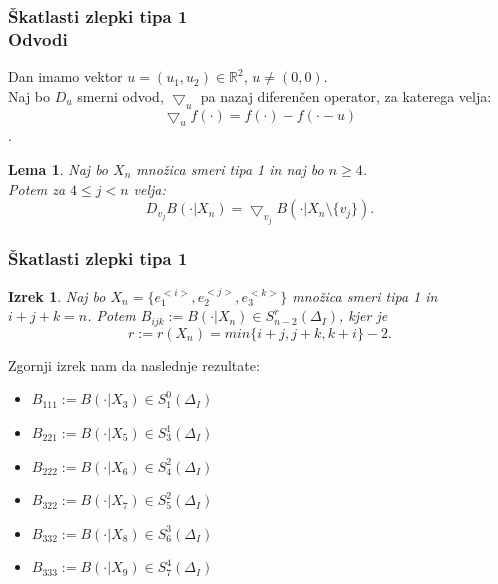 \documentclass{beamer}
\newtheorem{izrek}{Izrek}
\newtheorem{lema}{Lema}
\begin{document}
\begin{frame}
\frametitle{Škatlasti zlepki tipa 1 \\ Odvodi}

Dan imamo vektor $u = (u_1, u_2) \in \mathbb{R}^2$, $u \neq (0,0)$. \\
Naj bo $D_u$ smerni odvod, %
$ \bigtriangledown_u$ pa nazaj diferenčen operator, %
za katerega velja:
$$\bigtriangledown_u f(\cdot) = f(\cdot) - f(\cdot - u)$$.

\vspace{5mm}

\begin{lema}
\label{lema1}
Naj bo $X_n$ množica smeri tipa 1 in naj bo $n\geq 4$.\\
Potem za $4 \leq j < n$ velja:
$$D_{v_j} B(\cdot|X_n) = \bigtriangledown_{v_j} B(\cdot | X_n \setminus \{v_j\}).$$
\end{lema}
\end{frame}

\begin{frame}
\frametitle{Škatlasti zlepki tipa 1}

\begin{izrek}
Naj bo $X_n = \{e_1^{<i>},e_2^{<j>}, e_3^{<k>}\}$ množica smeri tipa 1 in $i+j+k = n$.
Potem $B_{ijk} := B(\cdot | X_n) \in S_{n-2}^r (\Delta_I)$, kjer je $$r := r(X_n) = min\{i+j, j+k, k+i\} -2.$$
\end{izrek}

\vspace{3mm}
\pause

Zgornji izrek nam da naslednje rezultate:
\begin{itemize}
\item $B_{111} := B(\cdot | X_3) \in S_{1}^0 (\Delta_I)$
\item $B_{221} := B(\cdot | X_5) \in S_{3}^1 (\Delta_I)$
\item $B_{222} := B(\cdot | X_6) \in S_{4}^2 (\Delta_I)$
\item $B_{322} := B(\cdot | X_7) \in S_{5}^2 (\Delta_I)$
\item $B_{332} := B(\cdot | X_8) \in S_{6}^3 (\Delta_I)$
\item $B_{333} := B(\cdot | X_9) \in S_{7}^4 (\Delta_I)$
\end{itemize}

\end{frame}
\end{document}
